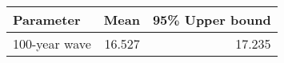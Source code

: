 \begin{tabular}{lrr}
\toprule
     Parameter &    Mean &  95\% Upper bound \\
\midrule
 100-year wave &  16.527 &            17.235 \\
\bottomrule
\end{tabular}
